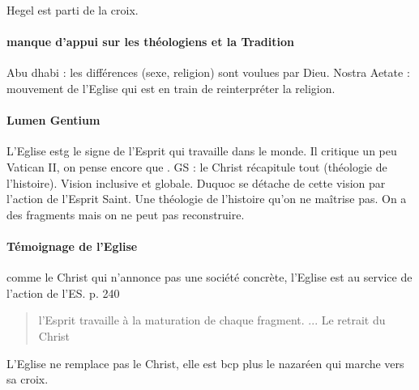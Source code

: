 Hegel est parti de la croix. 

\paragraph{manque d'appui sur les théologiens et la Tradition}

Abu dhabi : les différences (sexe, religion) sont voulues par Dieu. 
Nostra Aetate : mouvement de l'Eglise qui est en train de reinterpréter la religion. 

\paragraph{Lumen Gentium } L'Eglise estg le signe de l'Esprit qui travaille dans le monde. Il critique un peu Vatican II, on pense encore que . GS : le Christ récapitule tout (théologie de l'histoire). Vision inclusive et globale. Duquoc se détache de cette vision par l'action de l'Esprit Saint. Une théologie de l'histoire qu'on ne maîtrise pas. On a des fragments mais on ne peut pas reconstruire.

\paragraph{Témoignage de l'Eglise} comme le Christ qui n'annonce pas une société concrète, l'Eglise est au service de l'action de l'ES. 
p. 240 
\begin{quote}
    {l'Esprit travaille à la maturation de chaque fragment. ... Le retrait du Christ}
\end{quote}
L'Eglise ne remplace pas le Christ, elle est bcp plus le nazaréen qui marche vers sa croix.

